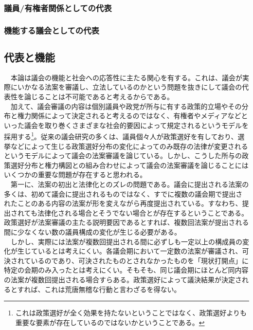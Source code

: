 \subsubsection{議員/有権者関係としての代表}

\subsubsection{機能する議会としての代表}


\subsection{代表と機能}
　本論は議会の機能と社会への応答性に主たる関心を有する。これは、議会が実際にいかなる法案を審議し、立法しているのかという問題を抜きにして議会の代表性を論じることは不可能であると考えるからである。\\
　加えて、議会審議の内容は個別議員や政党が所与に有する政策的立場やその分布と権力関係によって決定されると考えるのではなく、有権者やメディアなどといった議会を取り巻くさまざまな社会的要因によって規定されるというモデルを採用する\footnote{これは政策選好が全く効果を持たないということではなく、政策選好よりも重要な要素が存在しているのではないかということである。}。従来の議会研究の多くは、議員個々人が政策選好を有しており、選挙などによって生じる政策選好分布の変化によってのみ既存の法律が変更されるというモデルによって議会の法案審議を論じている。\citep*{Poole2017-ir,Krehbiel1998-ob,Cox2005-pn,Cox2007-xq,Aldrich1995-xf}しかし、こうした所与の政策選好分布と権力構図との組み合わせによって議会の法案審議を論じることにはいくつかの重要な問題が存在すると思われる。\\
　第一に、法案の初出と法律化とのズレの問題である。議会に提出される法案の多くは、初めて議会に提出されるものではなく、すでに複数の議会期で提出されたことのある内容の法案が形を変えながら再度提出されている。すなわち、提出されても法律化される場合とそうでない場合とが存在するということである。政策選好が法案審議の主たる説明要因であるとすれば、複数回法案が提出される間に少なくない数の議員構成の変化が生じる必要がある。\\
　しかし、実際には法案が複数回提出される間に必ずしも一定以上の構成員の変化が生じているとは考えにくい。各議会期において一定数の法案が審議され、可決されているのであり、可決されたものとされなかったものを「現状打開点」\citep*{Tsebelis2009-hf}に特定の会期のみ入ったとは考えにくい。そもそも、同じ議会期にほとんど同内容の法案が複数回提出される場合すらある。政策選好によって議決結果が決定されるとすれば、これは荒唐無稽な行動と言わざるを得ない。\\
